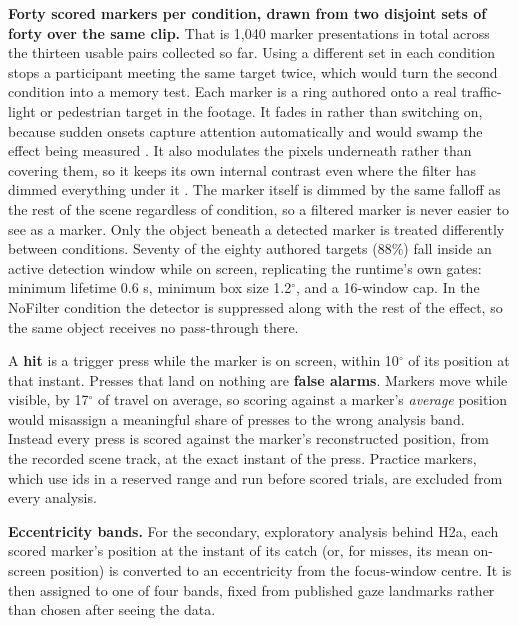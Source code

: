 \textbf{Forty scored markers per condition, drawn from two disjoint sets of forty over the same
clip.} That is 1,040 marker presentations in total across the thirteen usable pairs collected so far.
Using a different set in each condition stops a participant meeting the same target twice, which
would turn the second condition into a memory test. Each marker is a ring authored onto a real
traffic-light or pedestrian target in the footage. It fades in rather than switching on, because sudden onsets capture
attention automatically and would swamp the effect being measured \citep{yantis1984}. It also
modulates the pixels underneath rather than covering them, so it keeps its own internal contrast even
where the filter has dimmed everything under it \citep{wallis2015}. The marker itself is
dimmed by the same falloff as the rest of the scene regardless of condition, so a filtered marker is
never easier to see as a marker. Only the object beneath a detected marker is treated differently
between conditions. Seventy of the eighty authored targets (88\%) fall inside an active detection
window while on screen, replicating the runtime's own gates: minimum lifetime 0.6 s, minimum box size
1.2$^{\circ}$, and a 16-window cap. In the NoFilter condition the detector is suppressed along with the
rest of the effect, so the same object receives no pass-through there.

A \textbf{hit} is a trigger press while the marker is on screen, within 10$^{\circ}$ of its position at
that instant. Presses that land on nothing are \textbf{false alarms}. Markers move while visible, by
17$^{\circ}$ of travel on average, so scoring against a marker's \textit{average} position would
misassign a meaningful share of presses to the wrong analysis band. Instead every press is scored
against the marker's reconstructed position, from the recorded scene track, at the exact instant of
the press. Practice markers, which use ids in a reserved range and run before scored trials, are
excluded from every analysis.

\textbf{Eccentricity bands.} For the secondary, exploratory analysis behind H2a, each scored marker's
position at the instant of its catch (or, for misses, its mean on-screen position) is converted to an
eccentricity from the focus-window centre. It is then assigned to one of four bands, fixed from
published gaze landmarks rather than chosen after seeing the data.

